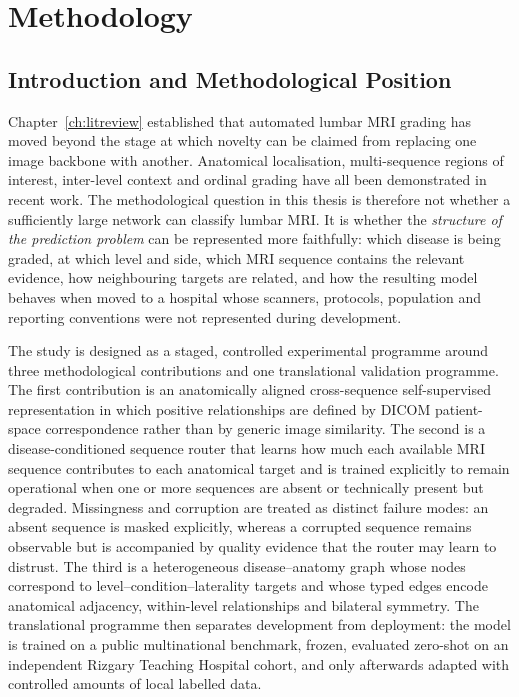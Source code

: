 \chapter{Methodology}
\label{ch:methodology}

\section{Introduction and Methodological Position}
\label{sec:method-intro}

Chapter~\ref{ch:litreview} established that automated lumbar MRI grading has
moved beyond the stage at which novelty can be claimed from replacing one image
backbone with another. Anatomical localisation, multi-sequence regions of
interest, inter-level context and ordinal grading have all been demonstrated in
recent work. The methodological question in this thesis is therefore not whether
a sufficiently large network can classify lumbar MRI. It is whether the
\emph{structure of the prediction problem} can be represented more faithfully:
which disease is being graded, at which level and side, which MRI sequence
contains the relevant evidence, how neighbouring targets are related, and how
the resulting model behaves when moved to a hospital whose scanners, protocols,
population and reporting conventions were not represented during development.

The study is designed as a staged, controlled experimental programme around
three methodological contributions and one translational validation programme.
The first contribution is an anatomically aligned cross-sequence
self-supervised representation in which positive relationships are defined by
DICOM patient-space correspondence rather than by generic image similarity.
The second is a disease-conditioned sequence router that learns how much each
available MRI sequence contributes to each anatomical target and is trained
explicitly to remain operational when one or more sequences are absent or
technically present but degraded. Missingness and corruption are treated as
distinct failure modes: an absent sequence is masked explicitly, whereas a
corrupted sequence remains observable but is accompanied by quality evidence
that the router may learn to distrust. The
third is a heterogeneous disease--anatomy graph whose nodes correspond to
level--condition--laterality targets and whose typed edges encode anatomical
adjacency, within-level relationships and bilateral symmetry. The translational
programme then separates development from deployment: the model is trained on a
public multinational benchmark, frozen, evaluated zero-shot on an independent
Rizgary Teaching Hospital cohort, and only afterwards adapted with controlled
amounts of local labelled data.

